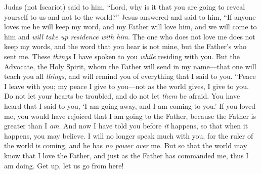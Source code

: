 \begin{biblechapter}
\verse Judas (not Iscariot) said to him, “Lord, why is it that you are going to reveal yourself to us and not to the world?”
\verse Jesus answered and said to him, “If anyone loves me he will keep my word, and my Father will love him, and we will come to him and \textit{will take up residence with him}.
\verse The one who does not love me does not keep my words, and the word that you hear is not mine, but the Father’s who sent me.
\verse These \textit{things} I have spoken to you \textit{while} residing with you.
\verse But the Advocate, the Holy Spirit, whom the Father will send in my name—that one will teach you all \textit{things}, and will remind you of everything that I said to you.
\verse “Peace I leave with you; my peace I give to you—not as the world gives, I give to you. Do not let your hearts be troubled, and do not let \textit{them} be afraid.
\verse You have heard that I said to you, ‘I am going away, and I am coming to you.’ If you loved me, you would have rejoiced that I am going to the Father, because the Father is greater than I \textit{am}.
\verse And now I have told you before \textit{it} happens, so that when it happens, you may believe.
\verse I will no longer speak much with you, for the ruler of the world is coming, and he has \textit{no power} \textit{over} me.
\verse But so that the world may know that I love the Father, and just as the Father has commanded me, thus I am doing. Get up, let us go from here!
\end{biblechapter}

